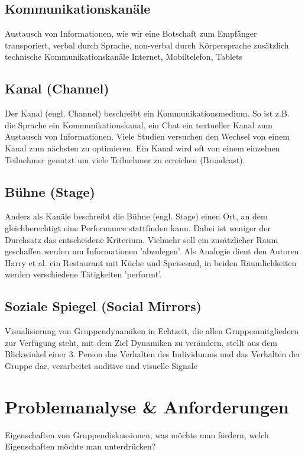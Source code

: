 \documentclass{seminarvorlage}
\begin{document}
\subsection{Kommunikationskanäle}
Austausch von Informationen, wie wir eine Botschaft zum Empfänger transporiert,
verbal durch Sprache, non-verbal durch Körpersprache
zusätzlich technische Kommunikationskanäle Internet, Mobiltelefon, Tablets

\subsection{Kanal (Channel)}
Der Kanal (engl. Channel) beschreibt ein Kommunikationsmedium. So ist z.B. die
Sprache ein Kommunikationskanal, ein Chat ein textueller Kanal zum Austausch von
Informationen. Viele Studien versuchen den Wechsel von einem Kanal zum nächsten
zu optimieren. Ein Kanal wird oft von einem einzelnen Teilnehmer genutzt um
viele Teilnehmer zu erreichen (Broadcast).

\subsection{Bühne (Stage)}
Anders als Kanäle beschreibt die Bühne (engl. Stage) einen Ort, an dem
gleichberechtigt eine Performance stattfinden kann. Dabei ist weniger der
Durchsatz das entscheidene Kriterium. Vielmehr soll ein zusätzlicher Raum
geschaffen werden um Informationen 'abzulegen'. Als Analogie dient den Autoren
Harry et al. ein Restaurant mit Küche und Speisesaal, in beiden Räumlichkeiten
werden verschiedene Tätigkeiten 'performt'.

\subsection{Soziale Spiegel (Social Mirrors)}
Visualisierung von Gruppendynamiken in Echtzeit, die allen Gruppenmitgliedern
zur Verfügung steht, mit dem Ziel Dynamiken zu verändern, stellt aus dem
Blickwinkel einer 3. Person das Verhalten des Individuums und das Verhalten der
Gruppe dar, verarbeitet auditive und visuelle Signale


\section{Problemanalyse \& Anforderungen}

Eigenschaften von Gruppendiskussionen, was möchte man fördern, welch Eigenschaften möchte man unterdrücken?
 
\end{document}
